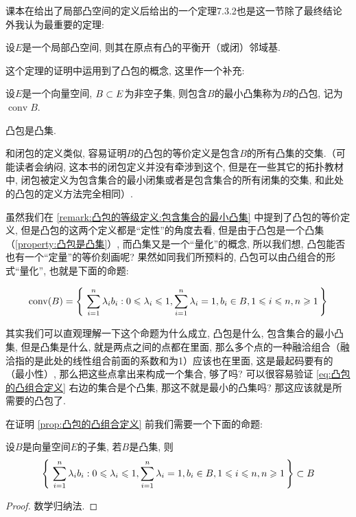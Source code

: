     课本在给出了局部凸空间的定义后给出的一个定理7.3.2也是这一节除了最终结论外我认为最重要的定理:
    \begin{theorem}[定理7.3.2]
        设$E$是一个局部凸空间, 则其在原点有凸的平衡开（或闭）邻域基.
    \end{theorem}

    这个定理的证明中运用到了凸包的概念, 这里作一个补充:
    \begin{definition}[凸包]\label{def:凸包}
        设$E$是一个向量空间, $B\subset E$为非空子集, 则包含$B$的最小凸集称为$B$的凸包, 记为$\operatorname{conv}B$.
    \end{definition}
    \begin{property}\label{property:凸包是凸集}
        凸包是凸集.
    \end{property}
    \begin{remark}\label{remark:凸包的等级定义:包含集合的最小凸集}
        和闭包的定义类似, 容易证明$B$的凸包的等价定义是包含$B$的所有凸集的交集.（可能读者会纳闷, 这本书的闭包定义并没有牵涉到这个, 但是在一些其它的拓扑教材中, 闭包被定义为包含集合的最小闭集或者是包含集合的所有闭集的交集, 和此处的凸包的定义方法完全相同）.
    \end{remark}
    
    虽然我们在 \autoref{remark:凸包的等级定义:包含集合的最小凸集} 中提到了凸包的等价定义, 但是凸包的这两个定义都是“定性”的角度去看, 但是由于凸包是一个凸集（\autoref{property:凸包是凸集}）, 而凸集又是一个“量化”的概念, 所以我们想, 凸包能否也有一个“定量”的等价刻画呢? 果然如同我们所预料的, 凸包可以由凸组合的形式“量化”, 也就是下面的命题:
    \begin{proposition}\label{prop:凸包的凸组合定义}
        \begin{equation}\label{eq:凸包的凸组合定义}
            \operatorname{conv}(B)=\set{\sum_{i=1}^{n} \lambda_{i} b_{i}}{ 0 \leqslant \lambda_{i} \leqslant 1, \sum_{i=1}^{n} \lambda_{i}=1, b_{i} \in B, 1 \leqslant i \leqslant n, n \geqslant 1}
        \end{equation}
    \end{proposition}

    其实我们可以直观理解一下这个命题为什么成立, 凸包是什么, 包含集合的最小凸集, 但是凸集是什么, 就是两点之间的点都在里面, 那么多个点的一种融洽组合（融洽指的是此处的线性组合前面的系数和为1）应该也在里面, 这是最起码要有的（最小性）, 那么把这些点拿出来构成一个集合, 够了吗? 可以很容易验证 \autoref{eq:凸包的凸组合定义} 右边的集合是个凸集, 那这不就是最小的凸集吗? 那这应该就是所需要的凸包了.
    
    在证明 \autoref{prop:凸包的凸组合定义} 前我们需要一个下面的命题:
    \begin{proposition}\label{prop:凸组合包含于凸集中}
        设$B$是向量空间$E$的子集, 若$B$是凸集, 则
        \[\set{\sum_{i=1}^{n} \lambda_{i} b_{i}}{ 0 \leqslant \lambda_{i} \leqslant 1, \sum_{i=1}^{n} \lambda_{i}=1, b_{i} \in B, 1 \leqslant i \leqslant n, n \geqslant 1} \zj B\]
    \end{proposition}
    \begin{proof}
        数学归纳法.
    \end{proof}

